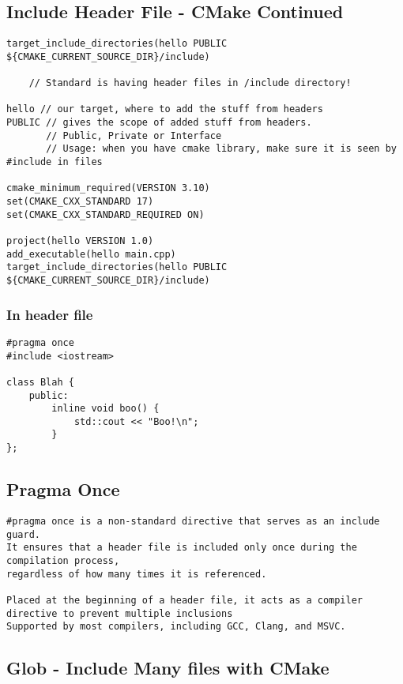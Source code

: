 \subsection{Include Header File - CMake Continued}

\begin{verbatim}
target_include_directories(hello PUBLIC ${CMAKE_CURRENT_SOURCE_DIR}/include)

    // Standard is having header files in /include directory!

hello // our target, where to add the stuff from headers
PUBLIC // gives the scope of added stuff from headers. 
       // Public, Private or Interface
       // Usage: when you have cmake library, make sure it is seen by #include in files

cmake_minimum_required(VERSION 3.10)
set(CMAKE_CXX_STANDARD 17)
set(CMAKE_CXX_STANDARD_REQUIRED ON)

project(hello VERSION 1.0)
add_executable(hello main.cpp)
target_include_directories(hello PUBLIC ${CMAKE_CURRENT_SOURCE_DIR}/include)
\end{verbatim}

\subsubsection{In header file}

\begin{verbatim}
#pragma once
#include <iostream>

class Blah {
    public:
        inline void boo() {
            std::cout << "Boo!\n";
        }
};
\end{verbatim}

\subsection{Pragma Once}

\begin{verbatim}
#pragma once is a non-standard directive that serves as an include guard. 
It ensures that a header file is included only once during the compilation process,
regardless of how many times it is referenced.

Placed at the beginning of a header file, it acts as a compiler directive to prevent multiple inclusions
Supported by most compilers, including GCC, Clang, and MSVC.
\end{verbatim}

\subsection{Glob - Include Many files with CMake}
 
